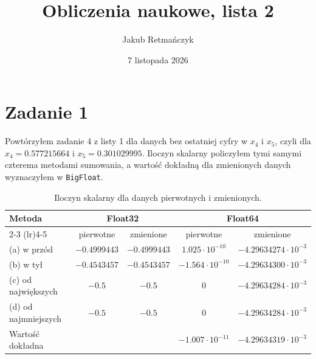 \documentclass[11pt,a4paper]{article}
\title{\vspace{-1.0cm}\textbf{Obliczenia naukowe, lista 2}}
\author{Jakub Retmańczyk}
\date{7 listopada 2026}
\begin{document}
\maketitle
\vspace{-0.6cm}

\section{Zadanie 1}

Powtórzyłem zadanie 4 z listy 1 dla danych bez ostatniej cyfry w $x_4$ i $x_5$, czyli dla $x_4 = 0.577215664$ i $x_5 = 0.301029995$. Iloczyn skalarny policzyłem tymi samymi czterema metodami sumowania, a wartość dokładną dla zmienionych danych wyznaczyłem w \texttt{BigFloat}.

\begin{table}[H]
\centering
\small
\caption{Iloczyn skalarny dla danych pierwotnych i zmienionych.}
\begin{tabular}{lcccc}
\toprule
\textbf{Metoda} & \multicolumn{2}{c}{\textbf{Float32}} & \multicolumn{2}{c}{\textbf{Float64}} \\
\cmidrule(lr){2-3} \cmidrule(lr){4-5}
 & pierwotne & zmienione & pierwotne & zmienione \\
\midrule
(a) w przód         & $-0.4999443$ & $-0.4999443$ & $1.025 \cdot 10^{-10}$  & $-4.29634274 \cdot 10^{-3}$ \\
(b) w tył           & $-0.4543457$ & $-0.4543457$ & $-1.564 \cdot 10^{-10}$ & $-4.29634300 \cdot 10^{-3}$ \\
(c) od największych & $-0.5$       & $-0.5$       & $0$                     & $-4.29634284 \cdot 10^{-3}$ \\
(d) od najmniejszych & $-0.5$      & $-0.5$       & $0$                     & $-4.29634284 \cdot 10^{-3}$ \\
\midrule
Wartość dokładna & \multicolumn{2}{c}{} & $-1.007 \cdot 10^{-11}$ & $-4.29634319 \cdot 10^{-3}$ \\
\bottomrule
\end{tabular}
\end{table}
\end{document}
